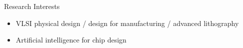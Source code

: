 
\begin{rSection}{Research Interests}
\begin{itemize}
    \item VLSI physical design / design for manufacturing / advanced lithography
    \item Artificial intelligence for chip design
\end{itemize}
\end{rSection}

\iffalse
\begin{rSection}{Research Topics}
	\begin{itemize}
		\item Layout Optimization  \\%
		 - Propose a framework to combine layout decomposition and mask optimization into one stage.
		\item Standard Cell Synthesis   \\%
		 - Develop an algorithm of generating standard cell layouts of regular style.
		\item Adder Synthesis  \\%
		 - Propose a machine learning based methodology to search for best performance-area/power trade-off adders.
	\end{itemize}
\end{rSection}
\fi

